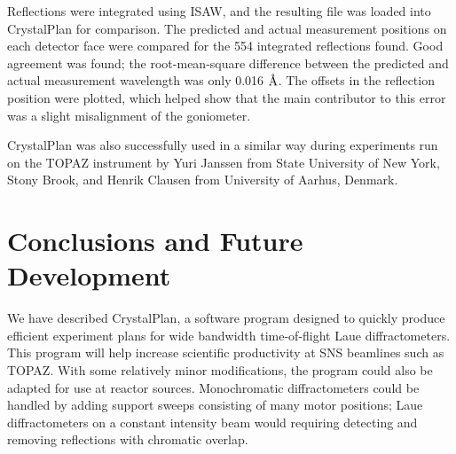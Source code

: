 \documentclass[final]{iucr}              %
\newcommand{\ang}{$\mathrm{\AA} $}
\begin{document}
Reflections were integrated using ISAW, and the resulting file was
loaded into CrystalPlan for comparison. The predicted and actual measurement
positions on each detector face were compared for the 554 integrated reflections
found. Good agreement was found; the root-mean-square difference between the
predicted and actual measurement wavelength was only 0.016 \ang. The offsets in the reflection
position were plotted, which helped show that the main contributor to this error
was a slight misalignment of the goniometer.


CrystalPlan was also successfully used in a similar way during experiments run
on the TOPAZ instrument by Yuri Janssen from State University of New York, Stony
Brook, and Henrik Clausen from University of Aarhus, Denmark. 


\section{Conclusions and Future Development}

We have described CrystalPlan, a software program designed to quickly produce
efficient experiment plans for wide bandwidth time-of-flight Laue
diffractometers. This program will help increase scientific productivity at SNS
beamlines such as TOPAZ. With some relatively minor modifications, the program
could also be adapted for use at reactor sources. Monochromatic diffractometers
could be handled by adding support sweeps consisting of many motor positions;
Laue diffractometers on a constant intensity beam would requiring
detecting and removing reflections with chromatic overlap.
\end{document}
